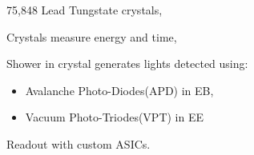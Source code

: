 \documentclass{beamer}
\begin{document}
\begin{frame}
   \vspace{-0.1cm}
    \begin{columns}
    \begin{column}{0.73\linewidth}
      \begin{tcolorbox}[colback=UNL@Cream!5,colframe=UNL@Cream!70,title=\textcolor{UMN@Maroon}{\textbf{\large{ECAL Properties}}}]
      \begin{itemize}
       \normalsize{
        \item 75,848 Lead Tungstate crystals,
        \item Crystals measure energy and time,
        \item Shower in crystal generates lights detected using:
          \begin{itemize}
           \item \tiny{Avalanche Photo-Diodes(APD) in EB,}
           \item \tiny{Vacuum Photo-Triodes(VPT) in EE}
          \end{itemize}
        \vspace{-0.30cm} 
        \item Readout with custom ASICs.%
       }
      \end{itemize}
    

\end{tcolorbox}
\end{column}
\end{columns}
\end{frame}
\end{document}

